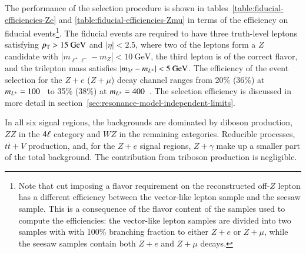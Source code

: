 The performance of the selection procedure is shown in tables~\ref{table:fiducial-efficiencies-Ze} and \ref{table:fiducial-efficiencies-Zmu} in terms of the efficiency on fiducial events\footnote{Note that cut imposing a flavor requirement on the reconstructed off-$Z$ lepton has a different efficiency between the vector-like lepton sample and the seesaw sample. This is a consequence of the flavor content of the samples used to compute the efficiencies: the vector-like lepton samples are divided into two samples with with 100\% branching fraction to either $Z+e$ or $Z+\mu$, while the seesaw samples contain both $Z+e$ and $Z+\mu$ decays.}. The fiducial events are required to have three truth-level leptons satisfying $p_{\text{T}}>15~\mbox{GeV}$ and $|\eta|<2.5$, where two of the leptons form a $Z$ candidate with $|m_{\ell^+ \ell^-}-m_Z|<10~\mbox{GeV}$, the third lepton is of the correct flavor, and the trilepton mass satisfies $|m_{3\ell}-m_{L^{\pm}}|<5~\mbox{GeV}$. The efficiency of the event selection for the $Z+e$ ($Z+\mu$) decay channel ranges from 20\% (36\%) at $m_{L^{\pm}}=100$~\GeV{} to 35\% (38\%) at $m_{L^{\pm}}=400$~\GeV. The selection efficiency is discussed in more detail in section~\ref{sec:resonance-model-independent-limits}. %

In all six signal regions, the backgrounds are dominated by diboson production, $ZZ$ in the $4\ell$ category and $WZ$ in the remaining categories. Reducible processes, $t\overline{t}+V$ production, and, for the $Z+e$ signal regions, $Z+\gamma$ make up a smaller part of the total background. The contribution from triboson production is negligible. 



